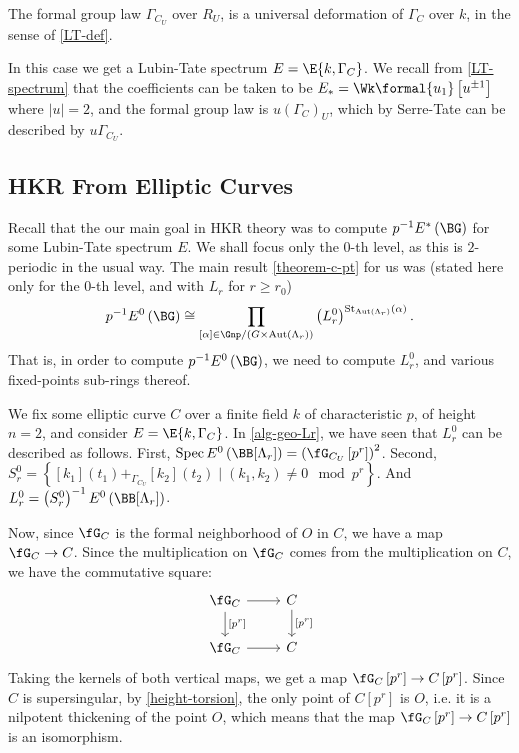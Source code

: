 \begin{theorem}[``$\Gamma_{C_U} = \left({\Gamma_C}\right)_U$"]\label{serre-tate}
	The formal group law $\Gamma_{C_U}$ over $R_U$, is a universal deformation of $\Gamma_C$ over $k$, in the sense of \ref{LT-def}.
\end{theorem}

In this case we get a Lubin-Tate spectrum $E = \E{k, \Gamma_C}$.
We recall from \ref{LT-spectrum} that the coefficients can be taken to be $E_* = \Wk\formal{u_1}\left[u^{\pm 1}\right]$ where $\left|u\right| = 2$, and the formal group law is $u\left(\Gamma_C\right)_U$, which by Serre-Tate can be described by $u \Gamma_{C_U}$.



\subsection{HKR From Elliptic Curves}

Recall that the our main goal in HKR theory was to compute $p^{-1} E^*\left(\BG\right)$ for some Lubin-Tate spectrum $E$.
We shall focus only the $0$-th level, as this is $2$-periodic in the usual way.
The main result \ref{theorem-c-pt} for us was (stated here only for the $0$-th level, and with $L_r$ for $r \geq r_0$)
$$
p^{-1} E^0\left(\BG\right)
\cong \prod_{\left[\alpha\right] \in \Gnp/{\left(G \times \aut \left(\Lambda_r\right)\right)}}
\left(L_r^0\right)^{\stab_{\aut \left(\Lambda_r\right)}\left(\alpha\right)}.
$$
That is, in order to compute $p^{-1} E^0\left(\BG\right)$, we need to compute $L_r^0$, and various fixed-points sub-rings thereof.

We fix some elliptic curve $C$ over a finite field $k$ of characteristic $p$, of height $n=2$, and consider $E = \E{k, \Gamma_C}$.
In \ref{alg-geo-Lr}, we have seen that $L_r^0$ can be described as follows.
First, $\spec E^0\left(\BB[\Lambda_r]\right) = \left(\fG_{C_U}\left[p^r\right]\right)^2$.
Second, $S_r^0 = \left\{ [k_1]\left(t_1\right) +_{\Gamma_{C_U}} [k_2]\left(t_2\right) \mid \left(k_1, k_2\right) \neq 0 \mod p^r\right\}$.
And $L_r^0 = \left(S_r^0\right)^{-1} E^0\left(\BB[\Lambda_r]\right)$.

Now, since $\fG_C$ is the formal neighborhood of $O$ in $C$, we have a map $\fG_C \to C$.
Since the multiplication on $\fG_C$ comes from the multiplication on $C$, we have the commutative square:
$$
\begin{tikzcd}
	\fG_C \arrow{r}{} \arrow{d}{\left[p^r\right]} & C \arrow{d}{\left[p^r\right]} \\
	\fG_C \arrow{r}{} & C
\end{tikzcd}
$$
Taking the kernels of both vertical maps, we get a map $\fG_C\left[p^r\right] \to C\left[p^r\right]$.
Since $C$ is supersingular, by \ref{height-torsion}, the only point of $C\left[p^r\right]$ is $O$, i.e. it is a nilpotent thickening of the point $O$, which means that the map $\fG_C\left[p^r\right] \to C\left[p^r\right]$ is an isomorphism.

